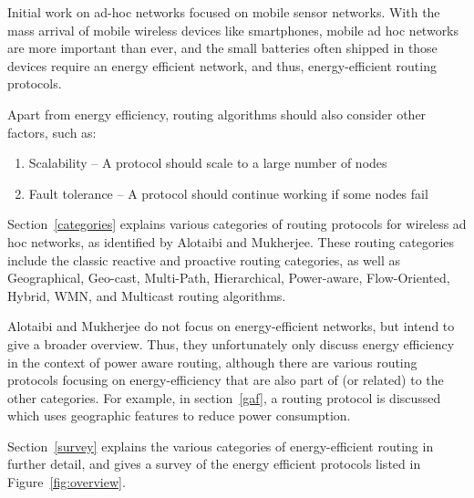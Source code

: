 Initial work on ad-hoc networks focused on mobile sensor networks. With the
mass arrival of mobile wireless devices like smartphones, mobile ad hoc networks
are more important than ever, and the small batteries often shipped in those devices
require an energy efficient network, and thus, energy-efficient routing
protocols.

Apart from energy efficiency, routing algorithms should also consider other
factors, such as:
\begin{enumerate}
   \item Scalability -- A protocol should scale to a large number of nodes
   \item Fault tolerance -- A protocol should continue working if some nodes fail
\end{enumerate}

Section~\ref{categories} explains various categories of routing protocols for
wireless ad hoc networks, as identified by Alotaibi and Mukherjee\cite{alotaibi2012survey}. These
routing categories include the classic reactive and proactive routing categories,
as well as
  Geographical, Geo-cast, Multi-Path, Hierarchical, Power-aware, Flow-Oriented,
  Hybrid, WMN, and Multicast routing algorithms. 


Alotaibi and Mukherjee\cite{alotaibi2012survey} do not focus on energy-efficient networks, but intend to give
a broader overview. Thus, they unfortunately only discuss energy efficiency in the
context of power aware routing, although there are various routing protocols
focusing on energy-efficiency that are also part of (or related) to the other categories.
For example, in section~\ref{gaf}, a routing protocol is discussed which
uses geographic features to reduce power consumption.

Section~\ref{survey} explains the various categories of energy-efficient
routing in further detail, and gives a survey of the energy efficient protocols
listed in Figure~\ref{fig:overview}.

